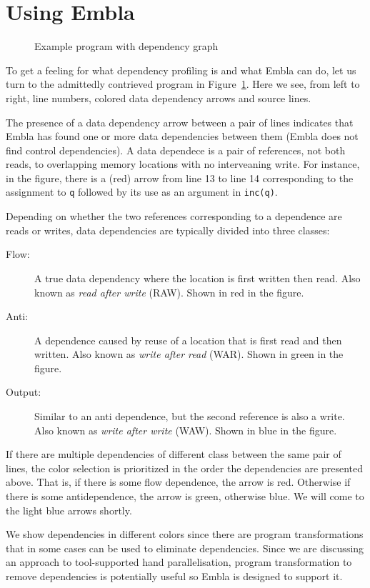 \section{Using Embla}

\begin{figure} 
\small

\caption{Example program with dependency graph} \label{ffirstex}
\end{figure}

To get a feeling for what dependency profiling is and what Embla can do, 
let us turn to the admittedly contrieved program in Figure~\ref{ffirstex}. 
Here we see, from 
left to right, line numbers, colored data dependency arrows and source 
lines. 

The presence of a data dependency arrow between a pair of lines indicates
that Embla has found one or more data dependencies between them
(Embla does not find control dependencies). A data dependece is a pair
of references, not both reads, to overlapping memory
locations with no interveaning write. For instance, in the figure, 
there is a (red) arrow from line 13 to line 14 corresponding to
the assignment to {\tt q} followed by its use as an argument in 
{\tt inc(q)}.

Depending on whether the two references corresponding to a dependence
are reads or writes, data dependencies are typically divided into 
three classes:
\begin{description}
\item[Flow:]
A true data dependency where the location is first written then
read. Also known as {\em read after write} (RAW). Shown in 
{\color{red} red} in the figure.
\item[Anti:]
A dependence caused by reuse of a location that is first read and then
written. Also known as {\em write after read} (WAR). Shown in 
{\color{green} green} in the figure.
\item[Output:]
Similar to an anti dependence, but the second reference is also a
write. Also known as {\em write after write} (WAW). Shown in 
{\color{blue} blue} in the figure.
\end{description}
If there are multiple dependencies of different class between the 
same pair of lines, the color selection is prioritized in the
order the dependencies are presented above. That is, if there is
some flow dependence, the arrow is red. Otherwise if there is 
some antidependence, the arrow is green, otherwise blue. We will 
come to the light blue arrows shortly.


We show dependencies in different colors since there are program
transformations that in some cases can be used to eliminate 
dependencies. Since we are discussing an approach to tool-supported
hand parallelisation, program transformation to remove dependencies
is potentially useful so Embla is designed to support it.

